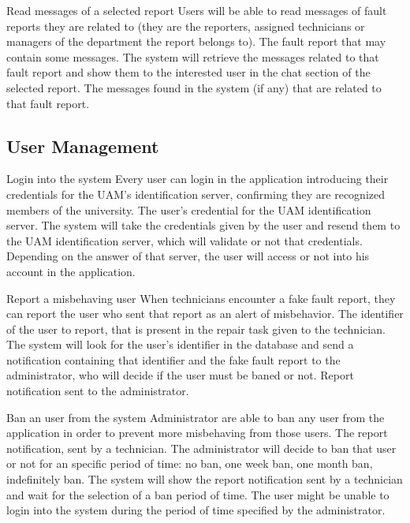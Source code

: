 \begin{requirement}{Read messages of a selected report}
\reqdesc Users will be able to read messages of fault reports they are related to (they are the reporters, assigned technicians or managers of the department the report belongs to).
\reqin The fault report that may contain some messages.
\reqsteps The system will retrieve the messages related to that fault report and show them to the interested user in the chat section of the selected report.
\reqout The messages found in the system (if any) that are related to that fault report.
\end{requirement}

\subsection{User Management}

\begin{requirement}{Login into the system}
\reqdesc Every user can login in the application introducing their credentials for the UAM's identification server, confirming they are recognized members of the university.
\reqin The user's credential for the UAM identification server.
\reqsteps The system will take the credentials given by the user and resend them to the UAM identification server, which will validate or not that credentials. 
\reqout Depending on the answer of that server, the user will access or not into his account in the application.
\end{requirement}

\begin{requirement}{Report a misbehaving user}
\reqdesc When technicians encounter a fake fault report, they can report the user who sent that report as an alert of misbehavior.
\reqin The identifier of the user to report, that is present in the repair task given to the technician.
\reqsteps The system will look for the user's identifier in the database and send a notification containing that identifier and the fake fault report to the administrator, who will decide if the user must be baned or not. 
\reqout Report notification sent to the administrator.
\end{requirement}

\begin{requirement}{Ban an user from the system}
\reqdesc Administrator are able to ban any user from the application in order to prevent more misbehaving from those users.
\reqin The report notification, sent by a technician. The administrator will decide to ban that user or not for an specific period of time: no ban, one week ban, one month ban, indefinitely ban.
\reqsteps The system will show the report notification sent by a technician and wait for the selection of a ban period of time. 
\reqout The user might be unable to login into the system during the period of time specified by the administrator.
\end{requirement}

